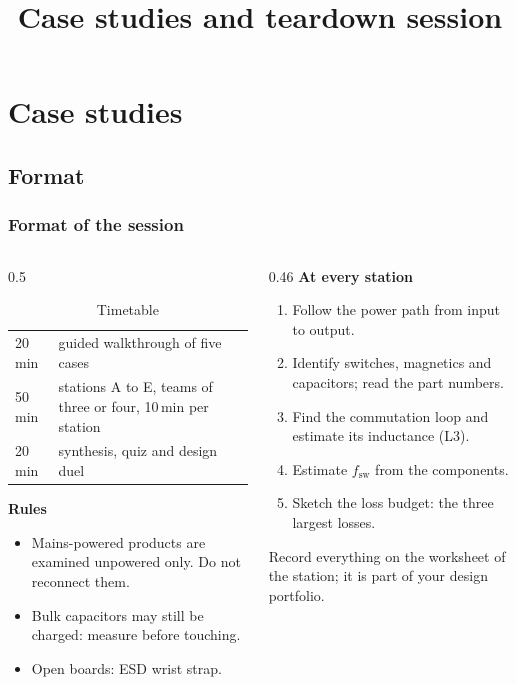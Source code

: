 \title[Case studies]{Case studies and teardown session}
\section{Case studies}

\begin{frame}[plain]
	\titlepage
\end{frame}

\subsection{Format}

\begin{frame}
	\frametitle{Format of the session}
	\begin{columns}[T]
		\begin{column}{0.5\textwidth}
			\begin{table}
				\centering
				\footnotesize
				\begin{tabular}{|l|>{\raggedright\arraybackslash}p{4.4cm}|}
					\hline
					20\,min & guided walkthrough of five cases                              \\
					50\,min & stations A to E, teams of three or four, 10\,min per station \\
					20\,min & synthesis, quiz and design duel                               \\
					\hline
				\end{tabular}
				\caption{Timetable}
			\end{table}
			\small
			\textbf{Rules}
			\begin{itemize}
				\item Mains-powered products are examined unpowered only. Do not reconnect them.
				\item Bulk capacitors may still be charged: measure before touching.
				\item Open boards: ESD wrist strap.
			\end{itemize}
		\end{column}
		\begin{column}{0.46\textwidth}
			\small
			\textbf{At every station}
			\begin{enumerate}
				\item Follow the power path from input to output.
				\item Identify switches, magnetics and capacitors; read the part numbers.
				\item Find the commutation loop and estimate its inductance (L3).
				\item Estimate $f_\mathrm{sw}$ from the components.
				\item Sketch the loss budget: the three largest losses.
			\end{enumerate}
			Record everything on the worksheet of the station; it is part of your design portfolio.
		\end{column}
	\end{columns}
\end{frame}


